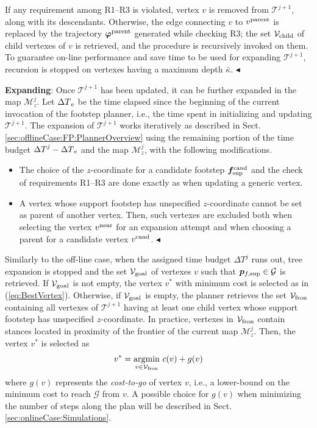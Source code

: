 If any requirement among R1--R3 is violated, vertex $v$ is removed from $\mathcal{T}^{j+1}$, along with its descendants.
Otherwise, the edge connecting $v$ to $v^{\rm parent}$ is replaced by the trajectory ${\bm{\varphi}}^{\rm parent}$ generated while checking R3; the set ${\cal V}_{\rm child}$ of child vertexes of $v$ is retrieved, and the procedure is recursively invoked on them. 
To guarantee on-line performance and save time to be used for expanding $\mathcal{T}^{j+1}$, recursion is stopped on vertexes having a maximum depth $\bar{\kappa}$. \hfill $\blacktriangleleft$

{\bf Expanding}: Once $\mathcal{T}^{j+1}$ has been updated, it can be further expanded in the map $\mathcal{M}_z^j$.
Let ${\Delta T}_{\rm e}$ be the time elapsed since the beginning of the current invocation of the footstep planner, i.e., the time spent in initializing and updating $\mathcal{T}^{j+1}$.
The expansion of $\mathcal{T}^{j+1}$ works iteratively as described in Sect. \ref{sec:offlineCase:FP:PlannerOverview} using the remaining portion of the time budget ${\Delta T}^j - {\Delta T}_{\rm e}$ and the map $\mathcal{M}_z^j$, with the following modifications.
\begin{itemize}
    \item The choice of the $z$-coordinate for a candidate footstep ${\bm{f}}_{\rm sup}^{\rm cand}$ and the check of requirements R1--R3 are done exactly as when updating a generic vertex. 
    \item A vertex whose support footstep has unspecified $z$-coordinate cannot be set as parent of another vertex.
    Then, such vertexes are excluded both when selecting the vertex $v^{\rm near}$ for an expansion attempt and when choosing a parent for a candidate vertex $v^{\rm cand}$. \hfill $\blacktriangleleft$
\end{itemize} 

Similarly to the off-line case, when the assigned time budget ${\Delta T}^j$ runs out, tree expansion is stopped and the set ${\cal V}_{\rm goal}$ of vertexes $v$ such that ${\bm{p}}_{f,{\rm sup}} \in {\cal G}$ is retrieved.
%
If ${\cal V}_{\rm goal}$ is not empty, the vertex $v^*$ with minimum cost is selected as in (\ref{eq:BestVertex}).
%
Otherwise, if ${\cal V}_{\rm goal}$ is empty, the planner retrieves the set ${\cal V}_{\rm fron}$ containing all vertexes of $\mathcal{T}^{j+1}$ having at least one child vertex whose support footstep has unspecified $z$-coordinate.
In practice, vertexes in ${\cal V}_{\rm fron}$ contain stances located in proximity of the frontier of the current map $\mathcal{M}_z^j$.
Then, the vertex $v^*$ is selected as
\begin{equation}
    \label{eq:BestVertexSubgoal}
    v^* = \underset{v \in {\cal V}_{\rm fron}}{\arg\!\min} \ c(v)+g(v)
\end{equation}
where $g(v)$ represents the \textit{cost-to-go} of vertex $v$, i.e., a lower-bound on the minimum cost to reach $\mathcal{G}$ from $v$.
A possible choice for $g(v)$ when minimizing the number of steps along the plan will be described in Sect. \ref{sec:onlineCase:Simulations}.

